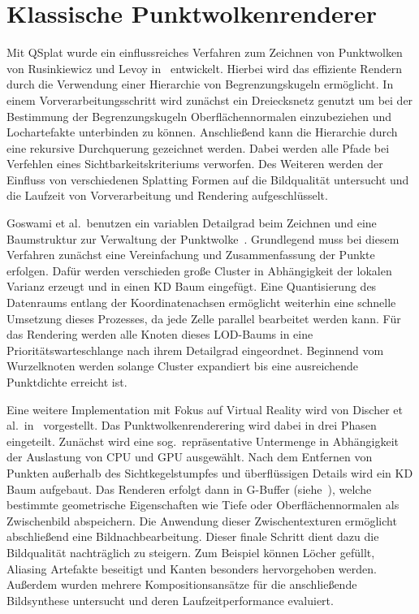 \documentclass[hyperref, beleg, german]{cgvpub}
\begin{document}
\section{Klassische Punktwolkenrenderer}

Mit QSplat wurde ein einflussreiches Verfahren zum Zeichnen von Punktwolken von
Rusinkiewicz und Levoy in~\cite{rusinkiewicz2000qsplat} entwickelt. Hierbei
wird das effiziente Rendern durch die Verwendung einer Hierarchie von
Begrenzungskugeln ermöglicht. In einem Vorverarbeitungsschritt wird zunächst
ein Dreiecksnetz genutzt um bei der Bestimmung der Begrenzungskugeln
Oberflächennormalen einzubeziehen und Lochartefakte unterbinden zu können.
Anschließend kann die Hierarchie durch eine rekursive Durchquerung gezeichnet
werden. Dabei werden alle Pfade bei Verfehlen eines Sichtbarkeitskriteriums
verworfen. Des Weiteren werden der Einfluss von verschiedenen Splatting Formen
auf die Bildqualität untersucht und die Laufzeit von Vorverarbeitung und
Rendering aufgeschlüsselt.

Goswami et al.\ benutzen ein variablen Detailgrad beim Zeichnen und eine
Baumstruktur zur Verwaltung der Punktwolke~\cite{goswami2010high}. Grundlegend
muss bei diesem Verfahren zunächst eine Vereinfachung und Zusammenfassung der
Punkte erfolgen. Dafür werden verschieden große Cluster in Abhängigkeit der
lokalen Varianz erzeugt und in einen KD Baum eingefügt. Eine Quantisierung des
Datenraums entlang der Koordinatenachsen ermöglicht weiterhin eine schnelle
Umsetzung dieses Prozesses, da jede Zelle parallel bearbeitet werden kann. Für
das Rendering werden alle Knoten dieses LOD-Baums in eine
Prioritätswarteschlange nach ihrem Detailgrad eingeordnet. Beginnend vom
Wurzelknoten werden solange Cluster expandiert bis eine ausreichende
Punktdichte erreicht ist.

Eine weitere Implementation mit Fokus auf Virtual Reality wird von Discher et
al.\ in~\cite{discher2018point} vorgestellt. Das Punktwolkenrenderering wird
dabei in drei Phasen eingeteilt. Zunächst wird eine sog.\ repräsentative
Untermenge in Abhängigkeit der Auslastung von CPU und GPU ausgewählt. Nach dem
Entfernen von Punkten außerhalb des Sichtkegelstumpfes und überflüssigen
Details wird ein KD Baum aufgebaut. Das Renderen erfolgt dann in G-Buffer
(siehe~\cite{saito1990comprehensible}), welche bestimmte geometrische
Eigenschaften wie Tiefe oder Oberflächennormalen als Zwischenbild abspeichern.
Die Anwendung dieser Zwischentexturen ermöglicht abschließend eine
Bildnachbearbeitung. Dieser finale Schritt dient dazu die Bildqualität
nachträglich zu steigern. Zum Beispiel können Löcher gefüllt, Aliasing
Artefakte beseitigt und Kanten besonders hervorgehoben werden. Außerdem wurden
mehrere Kompositionsansätze für die anschließende Bildsynthese untersucht und
deren Laufzeitperformance evaluiert.
\end{document}
